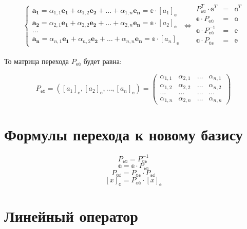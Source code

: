 \begin{equation*} 
	\begin{cases}
		\boldsymbol{a_1} = \alpha_{1,1}\boldsymbol{e_1} + \alpha_{1,2}\boldsymbol{e_2} + \dots + \alpha_{1,n}\boldsymbol{e_n} = \mathbb{e} \cdot [a_1]_\mathbb{e} \\
		\boldsymbol{a_2} = \alpha_{2,1}\boldsymbol{e_1} + \alpha_{2,2}\boldsymbol{e_2} + \dots + \alpha_{2,n}\boldsymbol{e_n} = \mathbb{e} \cdot [a_2]_\mathbb{e} \\
		\dots \\
		\boldsymbol{a_n} = \alpha_{n,1}\boldsymbol{e_1} + \alpha_{n,2}\boldsymbol{e_2} + \dots + \alpha_{n,n}\boldsymbol{e_n} = \mathbb{e} \cdot [a_n]_\mathbb{e}
	\end{cases}
	\Leftrightarrow
	\begin{matrix}
		P_\mathbb{ea}^T \cdot \mathbb{e}^T& =& \mathbb{a}^T \\
		\mathbb{e} \cdot P_\mathbb{ea}& =& \mathbb{a}\\
		\mathbb{a} \cdot P_\mathbb{ea}^{-1}& =& \mathbb{e}\\
		\mathbb{a} \cdot P_\mathbb{ae}& =& \mathbb{e}\\
	\end{matrix}
\end{equation*} 

То матрица перехода $P_\mathbb{ea}$ будет равна:

\[
P_\mathbb{ea} = 
\left([a_1]_\mathbb{e}, [a_2]_\mathbb{e}, \dots, [a_n]_\mathbb{e}\right) = 
\begin{pmatrix}
	\alpha_{1,1}& \alpha_{2, 1}& \dots& \alpha_{n,1}\\
	\alpha_{1,2}& \alpha_{2, 2}& \dots& \alpha_{n,2}\\
	\dots& \dots& \dots& \dots\\
	\alpha_{1,n}& \alpha_{2, n}& \dots& \alpha_{n,n}
\end{pmatrix}
\]

\section{Формулы перехода к новому базису}

$$ P_\mathbb{ea} = P_\mathbb{ae}^{-1} $$
$$ \mathbb{a} = \mathbb{e} \cdot P_\mathbb{ea} $$
$$ P_\mathbb{ad} = P_\mathbb{ae}\cdot P_\mathbb{ed} $$
$$ [x]_\mathbb{a} = P_\mathbb{ea} \cdot [x]_\mathbb{e} $$

\section{Линейный оператор}

